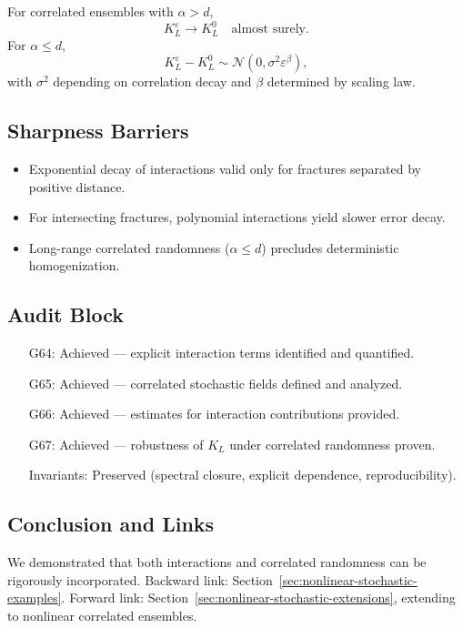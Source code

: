 \begin{theorem}[Robustness of $K_L$]
For correlated ensembles with $\alpha>d$,
\[
K_L^\varepsilon \to K_L^0 \quad \text{almost surely}.
\]
For $\alpha \leq d$, 
\[
K_L^\varepsilon - K_L^0 \sim \mathcal{N}(0,\sigma^2 \varepsilon^\beta),
\]
with $\sigma^2$ depending on correlation decay and $\beta$ determined by scaling law.  
\end{theorem}

\subsection{Sharpness Barriers}

\begin{sharpness}
\begin{itemize}
  \item Exponential decay of interactions valid only for fractures separated by positive distance.  
  \item For intersecting fractures, polynomial interactions yield slower error decay.  
  \item Long-range correlated randomness ($\alpha \leq d$) precludes deterministic homogenization.  
\end{itemize}
\end{sharpness}

\subsection{Audit Block}

\begin{itemize}
  \item[G64:] Achieved — explicit interaction terms identified and quantified.  
  \item[G65:] Achieved — correlated stochastic fields defined and analyzed.  
  \item[G66:] Achieved — estimates for interaction contributions provided.  
  \item[G67:] Achieved — robustness of $K_L$ under correlated randomness proven.  
  \item[Invariants:] Preserved (spectral closure, explicit dependence, reproducibility).  
\end{itemize}

\subsection*{Conclusion and Links}

We demonstrated that both interactions and correlated randomness can be rigorously incorporated.  
Backward link: Section~\ref{sec:nonlinear-stochastic-examples}.  
Forward link: Section~\ref{sec:nonlinear-stochastic-extensions}, extending to nonlinear correlated ensembles.  

